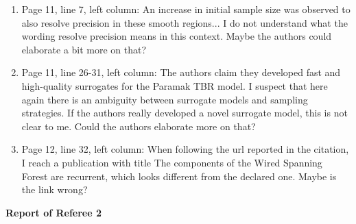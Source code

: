 \documentclass[12pt]{article}
\begin{document}
\begin{enumerate}
{\bf }

\item Page 11, line 7, left column:
An increase in initial sample size was observed to also resolve precision in these smooth regions... I do not understand what the wording resolve precision means in this context. Maybe the authors could elaborate a bit more on that?

{\bf }

\item Page 11, line 26-31, left column:
The authors claim they developed fast and high-quality surrogates for the Paramak TBR model. I suspect that here again there is an ambiguity between surrogate models and sampling strategies. If the authors really developed a novel surrogate model, this is not clear to me. Could the authors elaborate more on that?

{\bf }

\item Page 12, line 32, left column:
When following the url reported in the citation, I reach a publication with title The components of the Wired Spanning Forest are recurrent, which looks different from the declared one. Maybe is the link wrong?

{\bf }


\end{enumerate}

\newpage
\bigskip
\noindent
{\bf Report of Referee 2}
\end{document}
